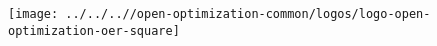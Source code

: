 \documentclass[11pt]{article}
\date{}
\begin{document}
\mbox{}\vfill\par
\noindent\begin{minipage}[c]{.4\linewidth}
  \texttt{[image: ../../..//open-optimization-common/logos/logo-open-optimization-oer-square]}
\end{minipage}\hfill
\begin{minipage}[c]{.58\linewidth}
  \maketitle
\end{minipage}
\thispagestyle{empty}
\vfill
\end{document}
